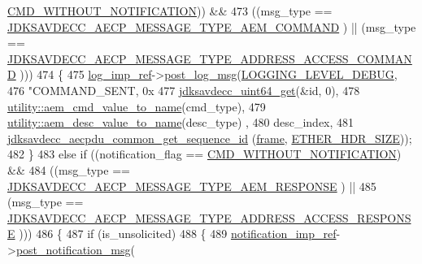 \begin{DoxyCode}
{{      \hyperlink{namespaceavdecc__lib_aabcadff06aa62be0ce47bc0646823604a1606d0f14328592cc52c4c5d319705ea}{CMD\_WITHOUT\_NOTIFICATION})) &&
473              ((msg\_type == \hyperlink{group__aecp__message__type_ga4625ce189cc209f42deb0629f48faf69}{JDKSAVDECC\_AECP\_MESSAGE\_TYPE\_AEM\_COMMAND}
      ) || (msg\_type == \hyperlink{group__aecp__message__type_gab24ef3f0c1054f136d5c56c0c8bc3132}{JDKSAVDECC\_AECP\_MESSAGE\_TYPE\_ADDRESS\_ACCESS\_COMMAND}
      )))
474     \{
475         \hyperlink{namespaceavdecc__lib_acbe3e2a96ae6524943ca532c87a28529}{log\_imp\_ref}->\hyperlink{classavdecc__lib_1_1log_a68139a6297697e4ccebf36ccfd02e44a}{post\_log\_msg}(\hyperlink{namespaceavdecc__lib_a501055c431e6872ef46f252ad13f85cdae3138c2a0a71a6404155ff912e450406}{LOGGING\_LEVEL\_DEBUG},
476                                   \textcolor{stringliteral}{"COMMAND\_SENT, 0x%
477                                   \hyperlink{group__endian_gac8c2b48b7d7db101708e0197e366ac42}{jdksavdecc\_uint64\_get}(&\textcolor{keywordtype}{id}, 0),
478                                   \hyperlink{namespaceavdecc__lib_1_1utility_a4c304db966bad783728a6a9e0aefed18}{utility::aem\_cmd\_value\_to\_name}(cmd\_type),
479                                   \hyperlink{namespaceavdecc__lib_1_1utility_a6bdd02679e5a911a071d4aa03be341f0}{utility::aem\_desc\_value\_to\_name}(desc\_type)
      ,
480                                   desc\_index,
481                                   \hyperlink{group__aecpdu__common_ga4c5015b65543e4753c336d98b63fea28}{jdksavdecc\_aecpdu\_common\_get\_sequence\_id}
      (\hyperlink{gst__avb__playbin_8c_ac8e710e0b5e994c0545d75d69868c6f0}{frame}, \hyperlink{namespaceavdecc__lib_a6c827b1a0d973e18119c5e3da518e65ca9512ad9b34302ba7048d88197e0a2dc0}{ETHER\_HDR\_SIZE}));
482     \}
483     \textcolor{keywordflow}{else} \textcolor{keywordflow}{if} ((notification\_flag == \hyperlink{namespaceavdecc__lib_aabcadff06aa62be0ce47bc0646823604a1606d0f14328592cc52c4c5d319705ea}{CMD\_WITHOUT\_NOTIFICATION}) &&
484              ((msg\_type == \hyperlink{group__aecp__message__type_ga9cad401e0f60634a8f084d93b0374d31}{JDKSAVDECC\_AECP\_MESSAGE\_TYPE\_AEM\_RESPONSE}
      ) ||
485               (msg\_type == \hyperlink{group__aecp__message__type_ga4d8df21361c95f23016e03d0ef625dc0}{JDKSAVDECC\_AECP\_MESSAGE\_TYPE\_ADDRESS\_ACCESS\_RESPONSE}
      )))
486     \{
487         \textcolor{keywordflow}{if} (is\_unsolicited)
488         \{
489             \hyperlink{namespaceavdecc__lib_aca078f7550e970a17b3f732c26bc3d83}{notification\_imp\_ref}->\hyperlink{classavdecc__lib_1_1notification_a2775ca78354ea78d68bf107c084b3822}{post\_notification\_msg}(
}}}
\end{DoxyCode}
